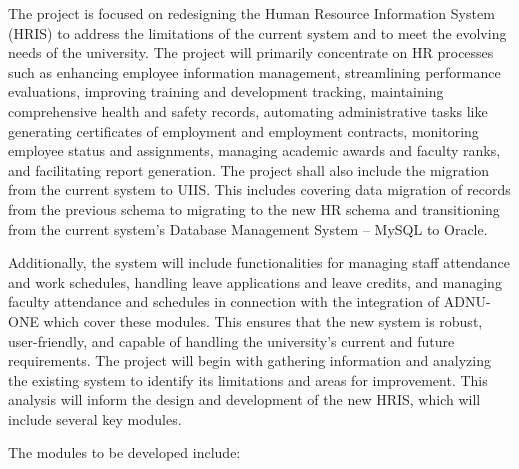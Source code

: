     The project is focused on redesigning the Human Resource Information System (HRIS) to address the limitations of the current system and to meet the evolving needs of the university. The project will primarily concentrate on HR processes such as enhancing employee information management, streamlining performance evaluations, improving training and development tracking, maintaining comprehensive health and safety records, automating administrative tasks like generating certificates of employment and employment contracts, monitoring employee status and assignments, managing academic awards and faculty ranks, and facilitating report generation. The project shall also include the migration from the current system to UIIS. This includes covering data migration of records from the previous schema to migrating to the new HR schema and transitioning from the current system's Database Management System -- MySQL to Oracle.
    
    Additionally, the system will include functionalities for managing staff attendance and work schedules, handling leave applications and leave credits, and managing faculty attendance and schedules in connection with the integration of ADNU-ONE which cover these modules. This ensures that the new system is robust, user-friendly, and capable of handling the university's current and future requirements. The project will begin with gathering information and analyzing the existing system to identify its limitations and areas for improvement. This analysis will inform the design and development of the new HRIS, which will include several key modules.
    
    The modules to be developed include:
    
